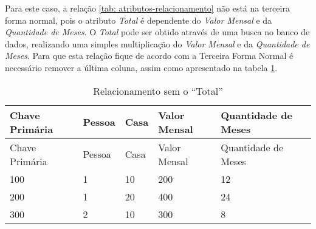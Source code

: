     
Para este caso, a relação \ref{tab: atributos-relacionamento} não está na terceira forma normal, pois o atributo \textit{Total} é dependente do \textit{Valor Mensal} e da \textit{Quantidade de Meses}. O \textit{Total} pode ser obtido através de uma busca no banco de dados, realizando uma simples multiplicação do \textit{Valor Mensal} e da \textit{Quantidade de Meses}. Para que esta relação fique de acordo com a Terceira Forma Normal é necessário remover a última coluna, assim como apresentado na tabela \ref{tab: total-a-pagar-removido}.

\begin{longtable}[]{@{}lllll@{}}
\caption{Relacionamento sem o ``Total'' \label{tab: total-a-pagar-removido}}\tabularnewline
\toprule
Chave Primária & Pessoa & Casa & Valor Mensal & Quantidade de Meses\tabularnewline
\midrule
\endfirsthead
\toprule
Chave Primária & Pessoa & Casa & Valor Mensal & Quantidade de Meses\tabularnewline
\midrule
\endhead
100 & 1 & 10 & 200 & 12\tabularnewline
200 & 1 & 20 & 400 & 24\tabularnewline
300 & 2 & 10 & 300 & 8\tabularnewline
\bottomrule
\end{longtable}


